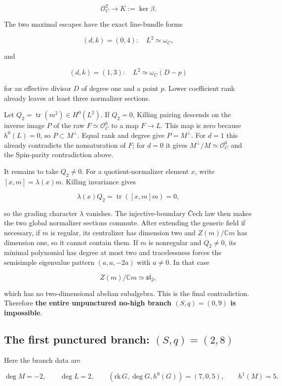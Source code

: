 \documentclass[11pt]{article}
\theoremstyle{definition}
\begin{document}
\[\mathcal O_C^2\longrightarrow K:=\ker\beta.\]

The two maximal escapes have the exact line-bundle
forms

\[(d,k)=(0,4):\quad L^2\simeq\omega_C,\]

and

\[(d,k)=(1,3):\quad
L^2\simeq\omega_C(D-p)\]

for an effective divisor \(D\) of degree one and a point \(p\). Lower
coefficient rank already leaves at least three normalizer sections.

Let \(Q_2=\operatorname{tr}(m^2)\in H^0(L^2)\). If \(Q_2=0\), Killing
pairing descends on the inverse image \(P\) of the raw
\(F\simeq\mathcal O_C^6\) to a map \(F\to L\). This map is zero because
\(h^0(L)=0\), so \(P\subset M^\perp\). Equal rank and degree give
\(P=M^\perp\). For \(d=1\) this already contradicts the nonsaturation of
\(F\); for \(d=0\) it gives \(M^\perp/M\simeq\mathcal O_C^6\) and the
Spin-parity contradiction above.

It remains to take \(Q_2\ne0\). For a quotient-normalizer element \(x\),
write \([x,m]=\lambda(x)m\). Killing invariance gives

\[\lambda(x)Q_2=\operatorname{tr}([x,m]m)=0,\]

so the grading character \(\lambda\) vanishes. The injective-boundary
\v{C}ech law then makes the two global normalizer sections commute. After
extending the generic field if necessary, if \(m\) is regular, its
centralizer has dimension two and \(Z(m)/\mathbb C m\) has dimension
one, so it cannot contain them. If \(m\) is nonregular and \(Q_2\ne0\),
its minimal polynomial has degree at most two and tracelessness forces
the semisimple eigenvalue pattern \((a,a,-2a)\) with \(a\ne0\). In that
case

\[Z(m)/\mathbb C m\simeq\mathfrak{sl}_2,\]

which has no two-dimensional abelian subalgebra. This is the final
contradiction. Therefore \textbf{the entire unpunctured no-high branch
\((S,q)=(0,9)\) is impossible}.

\subsection{\texorpdfstring{The first punctured branch:
\((S,q)=(2,8)\)}{The first punctured branch: (S,q)=(2,8)}}\label{the-first-punctured-branch-sq28}

Here the branch data are

\[\deg M=-2,\qquad \deg L=2,\qquad
(\mathrm{rk}\,G,\deg G,h^0(G))=(7,0,5),
\qquad h^1(M)=5.\]
\end{document}
